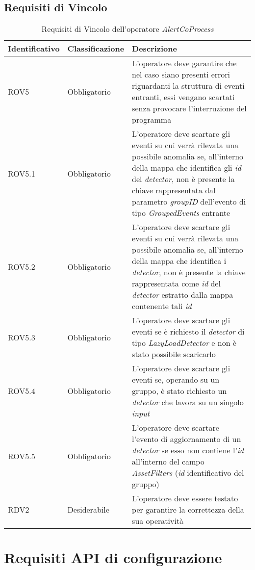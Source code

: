 \subsection{Requisiti di Vincolo}
{
\centering
\begin{longtable}{L{3cm} L{3cm} L{7.5cm}}
\caption{Requisiti di Vincolo dell'operatore \textit{AlertCoProcess}}\\
\textbf{Identificativo} &
\textbf{Classificazione}&
\textbf{Descrizione}\\
\endhead
\hline
ROV5 & Obbligatorio & L'operatore deve garantire che nel caso siano presenti errori riguardanti la struttura di eventi entranti, essi vengano scartati senza provocare l'interruzione del programma\\
\hline
ROV5.1 & Obbligatorio & L'operatore deve scartare gli eventi su cui verrà rilevata una possibile anomalia se, all'interno della mappa che identifica gli \textit{id} dei \textit{detector}, non è presente la chiave rappresentata dal parametro \textit{groupID} dell'evento di tipo \textit{GroupedEvents} entrante\\
\hline
ROV5.2 & Obbligatorio & L'operatore deve scartare gli eventi su cui verrà rilevata una possibile anomalia se, all'interno della mappa che identifica i \textit{detector}, non è presente la chiave rappresentata come \textit{id} del \textit{detector} estratto dalla mappa contenente tali \textit{id}\\
\hline
ROV5.3 & Obbligatorio & L'operatore deve scartare gli eventi se è richiesto il \textit{detector} di tipo \textit{LazyLoadDetector} e non è stato possibile scaricarlo\\
\hline
ROV5.4 & Obbligatorio & L'operatore deve scartare gli eventi se, operando su un gruppo, è stato richiesto un \textit{detector} che lavora su un singolo \textit{input}\\
\hline
ROV5.5 & Obbligatorio & L'operatore deve scartare l'evento di aggiornamento di un \textit{detector} se esso non contiene l'\textit{id} all'interno del campo \textit{AssetFilters} (\textit{id} identificativo del gruppo)\\
\hline
RDV2 & Desiderabile & L'operatore deve essere testato per garantire la correttezza della sua operatività\\
\hline
\end{longtable}
}

\section{Requisiti API di configurazione}
